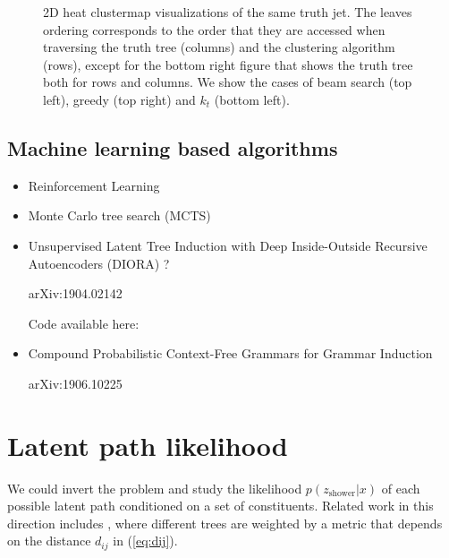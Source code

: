 \documentclass[12pt]{article}
\newcommand{\MYhref}[3][blue]{\href{#2}{\color{#1}{#3}}}%
\begin{document}
\begin{figure}
\begin{minipage}[c]{0.49\textwidth}
{	}
\end{minipage}
\caption{\small{2D heat clustermap visualizations of the same truth jet. The leaves ordering corresponds to the order that they are accessed when traversing the truth tree (columns) and the clustering algorithm (rows), except for the bottom right figure that shows the truth tree both for rows and columns. We show the cases of beam search (top left), greedy (top right) and $k_t$ (bottom left).}}
\label{fig:2Dclustermap70}
\end{figure}


\subsection{Machine learning based algorithms}

\begin{itemize}

\item Reinforcement Learning

\item Monte Carlo tree search (MCTS)

\item Unsupervised Latent Tree Induction with Deep Inside-Outside Recursive Autoencoders (DIORA) ?

arXiv:1904.02142

Code available here: \MYhref{https://github.com/iesl/diora}{github.com/iesl/diora}

\item Compound Probabilistic Context-Free Grammars for Grammar Induction

arXiv:1906.10225

\end{itemize}

\vspace{0.6cm}
 \section{Latent path likelihood}
 
We could invert the problem and study the likelihood  $p(z_{\text{shower}} | x)$ of each possible latent path conditioned on a set of constituents. Related work in this direction includes \cite{Ellis:2012sn}, where different trees are weighted by a metric that depends on the distance $d_{ij}$ in (\ref{eq:dij}).





\end{document}
